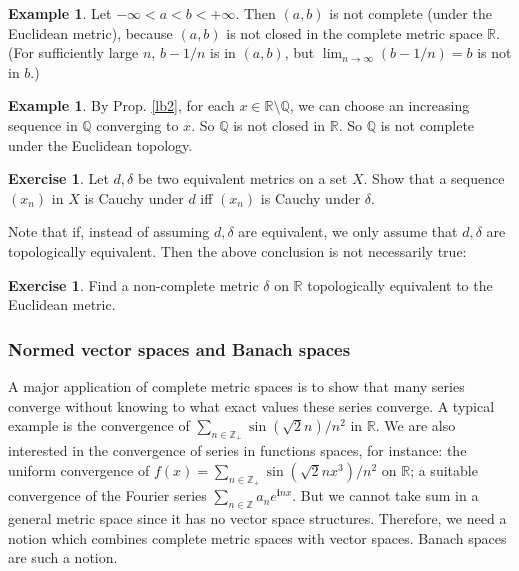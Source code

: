 \documentclass[12pt,b5paper,notitlepage]{article}
\theoremstyle{definition}
\newtheorem{eg}[df]{Example}
\newtheorem{exe}[df]{Exercise}
\theoremstyle{plain}
\newcommand{\im}{\mathbf{i}}
\newcommand{\Zbb}{\mathbb Z}
\newcommand{\Qbb}{\mathbb Q}
\newcommand{\Rbb}{\mathbb R}
\numberwithin{equation}{section}
\begin{document}
\begin{eg}
Let $-\infty<a<b<+\infty$. Then $(a,b)$ is not complete (under the Euclidean metric), because $(a,b)$ is not closed in the complete metric space $\Rbb$. (For sufficiently large $n$, $b-1/n$ is in $(a,b)$, but $\lim_{n\rightarrow\infty} (b-1/n)=b$ is not in $b$.) 
\end{eg}

\begin{eg}
By Prop. \ref{lb2}, for each $x\in\Rbb\setminus\Qbb$, we can choose an increasing sequence in $\Qbb$ converging to $x$. So $\Qbb$ is not closed in $\Rbb$. So $\Qbb$ is not complete under the Euclidean topology.
\end{eg}


\begin{exe}
Let $d,\delta$ be two equivalent metrics on a set $X$. Show that a sequence $(x_n)$ in $X$ is Cauchy under $d$ iff $(x_n)$ is Cauchy under $\delta$. 

Note that if, instead of assuming $d,\delta$ are equivalent, we only assume that $d,\delta$ are topologically equivalent. Then the above conclusion is not necessarily true:
\end{exe}


\begin{exe}
Find a non-complete metric $\delta$ on $\Rbb$ topologically equivalent to the Euclidean metric.
\end{exe}




\subsubsection{Normed vector spaces and Banach spaces}



A major application of complete metric spaces is to show that many series converge without knowing to what exact values these series converge. A typical example is the convergence of $\sum_{n\in\Zbb_+}\sin(\sqrt 2n)/n^2$ in $\Rbb$. We are also interested in the convergence of series in functions spaces, for instance: the uniform convergence of $f(x)=\sum_{n\in\Zbb_+}\sin(\sqrt 2nx^3)/n^2$ on $\Rbb$; a suitable convergence of the Fourier series $\sum_{n\in\Zbb}a_ne^{\im n x}$. But we cannot take sum in a general metric space since it has no vector space structures. Therefore, we need a notion which combines complete metric spaces with vector spaces. Banach spaces are such a notion. 
\end{document}
